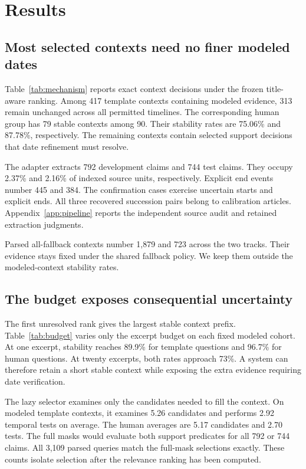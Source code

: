 \section{Results}
\label{sec:results}

\subsection{Most selected contexts need no finer modeled dates}

Table~\ref{tab:mechanism} reports exact context decisions under the frozen title-aware ranking.
Among 417 template contexts containing modeled evidence, 313 remain unchanged across all permitted timelines.
The corresponding human group has 79 stable contexts among 90.
Their stability rates are 75.06\% and 87.78\%, respectively.
The remaining contexts contain selected support decisions that date refinement must resolve.


The adapter extracts 792 development claims and 744 test claims.
They occupy 2.37\% and 2.16\% of indexed source units, respectively.
Explicit end events number 445 and 384.
The confirmation cases exercise uncertain starts and explicit ends.
All three recovered succession pairs belong to calibration articles.
Appendix~\ref{app:pipeline} reports the independent source audit and retained extraction judgments.

Parsed all-fallback contexts number 1,879 and 723 across the two tracks.
Their evidence stays fixed under the shared fallback policy.
We keep them outside the modeled-context stability rates.

\subsection{The budget exposes consequential uncertainty}

The first unresolved rank gives the largest stable context prefix.
Table~\ref{tab:budget} varies only the excerpt budget on each fixed modeled cohort.
At one excerpt, stability reaches 89.9\% for template questions and 96.7\% for human questions.
At twenty excerpts, both rates approach 73\%.
A system can therefore retain a short stable context while exposing the extra evidence requiring date verification.


The lazy selector examines only the candidates needed to fill the context.
On modeled template contexts, it examines 5.26 candidates and performs 2.92 temporal tests on average.
The human averages are 5.17 candidates and 2.70 tests.
The full masks would evaluate both support predicates for all 792 or 744 claims.
All 3,109 parsed queries match the full-mask selections exactly.
These counts isolate selection after the relevance ranking has been computed.

